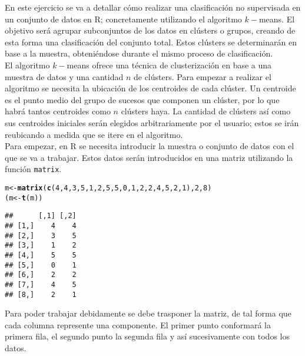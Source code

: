 \documentclass[12pt]{report}\usepackage[]{graphicx}\usepackage[dvipsnames]{xcolor}
\makeatletter
\newcommand{\hlnum}[1]{\textcolor[rgb]{0.686,0.059,0.569}{#1}}%
\newcommand{\hlstd}[1]{\textcolor[rgb]{0.345,0.345,0.345}{#1}}%
\newcommand{\hlkwb}[1]{\textcolor[rgb]{0.69,0.353,0.396}{#1}}%
\newcommand{\hlkwd}[1]{\textcolor[rgb]{0.737,0.353,0.396}{\textbf{#1}}}%
\newenvironment{kframe}{%
 \def\at@end@of@kframe{}%
 \ifinner\ifhmode%
  \def\at@end@of@kframe{\end{minipage}}%
  \begin{minipage}{\columnwidth}%
 \fi\fi%
 \def\FrameCommand##1{\hskip\@totalleftmargin \hskip-\fboxsep
 \colorbox{shadecolor}{##1}\hskip-\fboxsep
     \hskip-\linewidth \hskip-\@totalleftmargin \hskip\columnwidth}%
 \MakeFramed {\advance\hsize-\width
   \@totalleftmargin\z@ \linewidth\hsize
   \@setminipage}}%
 {\par\unskip\endMakeFramed%
 \at@end@of@kframe}
\newenvironment{knitrout}{}{} %
\makeatother
\begin{document}
				En este ejercicio se va a detallar cómo realizar una clasificación no supervisada en un conjunto de datos en R; concretamente utilizando el algoritmo $k-$means. El objetivo será agrupar subconjuntos de los datos en clústers o grupos, creando de esta forma una clasificación del conjunto total. Estos clústers se determinarán en base a la muestra, obteniéndose durante el mismo proceso de clasificación.\\
				
				El algoritmo $k-$means ofrece una técnica de clusterización en base a una muestra de datos y una cantidad $n$ de clústers. Para empezar a realizar el algoritmo se necesita la ubicación de los centroides de cada clúster. Un centroide es el punto medio del grupo de sucesos que componen un clúster, por lo que habrá tantos centroides como $n$ clústers haya. La cantidad de clústers así como sus centroides iniciales serán elegidos arbitrariamente por el usuario; estos se irán reubicando a medida que se itere en el algoritmo. \\
				
				Para empezar, en R se necesita introducir la muestra o conjunto de datos con el que se va a trabajar. Estos datos serán introducidos en una matriz utilizando la función \texttt{matrix}.
				
\begin{knitrout}
\color{fgcolor}\begin{kframe}
\begin{alltt}
\hlstd{m} \hlkwb{<-} \hlkwd{matrix}\hlstd{(}\hlkwd{c}\hlstd{(}\hlnum{4}\hlstd{,}\hlnum{4}\hlstd{,} \hlnum{3}\hlstd{,}\hlnum{5}\hlstd{,} \hlnum{1}\hlstd{,}\hlnum{2}\hlstd{,} \hlnum{5}\hlstd{,}\hlnum{5}\hlstd{,} \hlnum{0}\hlstd{,}\hlnum{1}\hlstd{,} \hlnum{2}\hlstd{,}\hlnum{2}\hlstd{,} \hlnum{4}\hlstd{,}\hlnum{5}\hlstd{,} \hlnum{2}\hlstd{,}\hlnum{1}\hlstd{),}\hlnum{2}\hlstd{,}\hlnum{8}\hlstd{)}
\hlstd{(m} \hlkwb{<-} \hlkwd{t}\hlstd{(m))}
\end{alltt}
\begin{verbatim}
##      [,1] [,2]
## [1,]    4    4
## [2,]    3    5
## [3,]    1    2
## [4,]    5    5
## [5,]    0    1
## [6,]    2    2
## [7,]    4    5
## [8,]    2    1
\end{verbatim}
\end{kframe}
\end{knitrout}
				
				Para poder trabajar debidamente se debe trasponer la matriz, de tal forma que cada columna represente una componente. El primer punto conformará la primera fila, el segundo punto la segunda fila y así sucesivamente con todos los datos.\\
				
\end{document}
